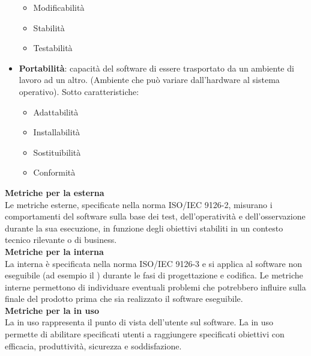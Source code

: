 \begin{itemize}
\begin{itemize}
\item Modificabilità
\item Stabilità
\item Testabilità
\end{itemize}
\item \textbf{Portabilità}: capacità del software di essere trasportato da un ambiente di lavoro ad un altro. (Ambiente che può variare dall'hardware al sistema operativo).
Sotto caratteristiche:
\begin{itemize}
\item Adattabilità
\item Installabilità
\item Sostituibilità
\item Conformità
\end{itemize}
\end{itemize}
\textbf{Metriche per la  esterna}\\
Le metriche esterne, specificate nella norma ISO/IEC 9126-2, misurano i comportamenti del software sulla base dei test, dell'operatività e dell'osservazione durante la sua esecuzione, in funzione degli obiettivi stabiliti in un contesto tecnico rilevante o di business.\\
\textbf{Metriche per la  interna}\\
La  interna è specificata nella norma ISO/IEC 9126-3 e si applica al software non eseguibile (ad esempio il ) durante le fasi di progettazione e codifica. 
Le metriche interne permettono di individuare eventuali problemi che potrebbero influire sulla  finale del prodotto prima che sia realizzato il software eseguibile.\\
\textbf{Metriche per la  in uso}\\
La  in uso rappresenta il punto di vista dell'utente sul software. La  in uso permette di abilitare specificati utenti a raggiungere specificati obiettivi con efficacia, produttività, sicurezza e soddisfazione.
